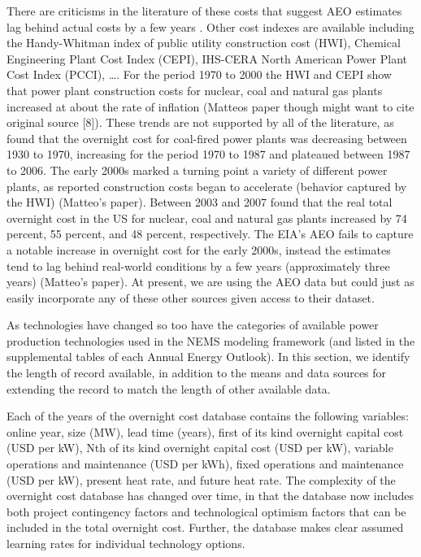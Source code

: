 \documentclass[10pt]{report}
\begin{document}
There are criticisms in the literature of these costs that suggest AEO estimates lag behind actual costs by a few years \parencite{}.
Other cost indexes are available including the Handy-Whitman index of public utility construction cost (HWI), Chemical Engineering Plant Cost Index (CEPI), IHS-CERA North American Power Plant Cost Index (PCCI), \ldots.
For the period 1970 to 2000 the HWI and CEPI show that power plant construction costs for nuclear, coal and natural gas plants increased at about the rate of inflation \parencite{} (Matteos paper though might want to cite original source [8]). 
These trends are not supported by all of the literature, as \cite{} found that the overnight cost for coal-fired power plants was decreasing between 1930 to 1970, increasing for the period 1970 to 1987 and plateaued between 1987 to 2006. 
The early 2000s marked a turning point a variety of different power plants, as reported construction costs began to accelerate (behavior captured by the HWI) \parencite{} (Matteo's paper). 
Between 2003 and 2007 \cite{du2009update} found that the real total overnight cost in the US for nuclear, coal and natural gas plants increased by 74 percent, 55 percent, and 48 percent, respectively. 
The EIA's AEO fails to capture a notable increase in overnight cost for the early 2000s, instead the estimates tend to lag behind real-world conditions by a few years (approximately three years) \parencite{}(Matteo's paper).
At present, we are using the AEO data but could just as easily incorporate any of these other sources given access to their dataset. 
  
As technologies have changed so too have the categories of available power production technologies used in the NEMS modeling framework (and listed in the supplemental tables of each Annual Energy Outlook). 
In this section, we identify the length of record available, in addition to the means and data sources for extending the record to match the length of other available data. 

Each of the years of the overnight cost database contains the following variables: online year, size (MW), lead time (years), first of its kind overnight capital cost (USD per kW), Nth of its kind overnight capital cost (USD per kW), variable operations and maintenance (USD per kWh), fixed operations and maintenance (USD per kW), present heat rate, and future heat rate. 
The complexity of the overnight cost database has changed over time, in that the database now includes both project contingency factors and technological optimism factors that can be included in the total overnight cost. 
Further, the database makes clear assumed learning rates for individual technology options. 
\end{document}
